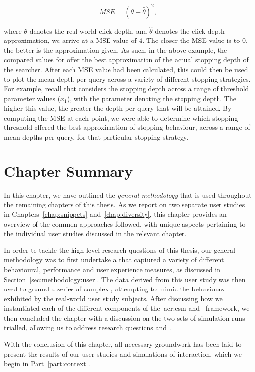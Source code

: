 \vspace*{-4mm}
\begin{equation}
MSE = (\theta - \hat{\theta})^{2},
\end{equation}

where $\theta$ denotes the real-world click depth, and $\hat{\theta}$ denotes the click depth approximation, we arrive at a MSE value of $4$. The closer the MSE value is to $0$, the better is the approximation given. As such, in the above example, the compared values for  offer the best approximation of the actual stopping depth of the searcher. After each MSE value had been calculated, this could then be used to plot the mean depth per query across a variety of different stopping strategies. For example, recall that  considers the stopping depth across a range of threshold parameter values ($x_1$), with the parameter denoting the stopping depth. The higher this value, the greater the depth per query that will be attained. By computing the MSE at each point, we were able to determine which stopping threshold offered the best approximation of stopping behaviour, across a range of mean depths per query, for that particular stopping strategy.

\section{Chapter Summary}
In this chapter, we have outlined the \emph{general methodology} that is used throughout the remaining chapters of this thesis. As we report on two separate user studies in Chapters~\ref{chap:snippets} and~\ref{chap:diversity}, this chapter provides an overview of the common approaches followed, with unique aspects pertaining to the individual user studies discussed in the relevant chapter.

In order to tackle the high-level research questions of this thesis, our general methodology was to first undertake a  that captured a variety of different behavioural, performance and user experience measures, as discussed in Section~\ref{sec:methodology:user}. The data derived from this user study was then used to ground a series of complex , attempting to mimic the behaviours exhibited by the real-world user study subjects. After discussing how we instantiated each of the different components of the~\gls{acr:csm} and \simiir~framework, we then concluded the chapter with a discussion on the two sets of simulation runs trialled, allowing us to address research questions  and .

With the conclusion of this chapter, all necessary groundwork has been laid to present the results of our user studies and simulations of interaction, which we begin in Part~\ref{part:context}.